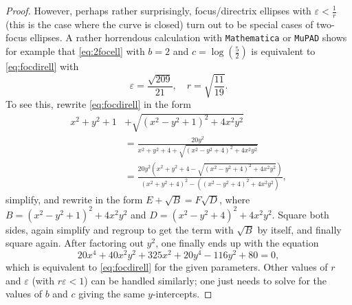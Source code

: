 \documentclass[12pt]{amsart}
\theoremstyle{definition}
\begin{document}
\begin{proof}
However, perhaps rather surprisingly, focus/directrix ellipses with
$\varepsilon < \frac{1}{r}$ (this is the case where the curve is closed)
turn out to be special cases of two-focus ellipses.
A rather horrendous calculation
with \texttt{Mathematica} or \texttt{MuPAD}
shows for example that \eqref{eq:2focell}
with $b=2$ and $c=\log\left(\frac52\right)$ is equivalent to
\eqref{eq:focdirell} with
\[
\varepsilon=\frac{\sqrt{209}}{21}, \quad r=\sqrt{\frac{11}{19}}.
\]
To see this, rewrite \eqref{eq:focdirell}  in the form
\[
\begin{aligned}
x^2+y^2+1&+\sqrt{(x^2 - y^2 + 1)^2 + 4 x^2 y^2}\\ &=
\frac{20y^2}{x^2+y^2+4+\sqrt{(x^2 - y^2 + 4)^2 + 4 x^2 y^2}}\\
&=\frac{20y^2\left(x^2+y^2+4-\sqrt{(x^2 - y^2 + 4)^2 + 4 x^2 y^2}\right)}
{(x^2+y^2+4)^2-((x^2 - y^2 + 4)^2 + 4 x^2 y^2)},
\end{aligned}
\]
simplify, and rewrite in the form $E + \sqrt{B} = F\sqrt{D}$,
where $B=(x^2 - y^2 + 1)^2 + 4 x^2 y^2$ and $D=(x^2 - y^2 + 4)^2 + 4 x^2 y^2$.
Square both sides, again simplify and regroup to get the
term with $\sqrt{B}$ by itself, and finally square again.
After factoring out $y^2$, one finally ends up with the equation
\[
20x^4 + 40x^2y^2 + 325x^2 + 20y^4 - 116y^2 + 80 = 0,
\]
which is equivalent to \eqref{eq:focdirell} for the given parameters.
Other values of $r$ and $\varepsilon$
(with $r\varepsilon < 1$) can be handled similarly; one just
needs to solve for the values of $b$ and $c$ giving the same $y$-intercepts.
\end{proof} 

  
\end{document}
